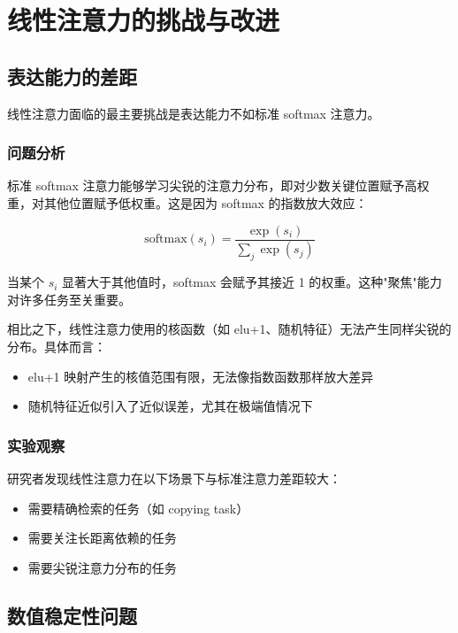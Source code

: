 \chapter{线性注意力的挑战与改进}

\section{表达能力的差距}

线性注意力面临的最主要挑战是表达能力不如标准 softmax 注意力。

\subsection{问题分析}

标准 softmax 注意力能够学习尖锐的注意力分布，即对少数关键位置赋予高权重，对其他位置赋予低权重。这是因为 softmax 的指数放大效应：

\begin{equation}
    \text{softmax}(s_i) = \frac{\exp(s_i)}{\sum_j \exp(s_j)}
\end{equation}

当某个 $s_i$ 显著大于其他值时，softmax 会赋予其接近 1 的权重。这种"聚焦"能力对许多任务至关重要。

相比之下，线性注意力使用的核函数（如 elu+1、随机特征）无法产生同样尖锐的分布。具体而言：

\begin{itemize}
    \item elu+1 映射产生的核值范围有限，无法像指数函数那样放大差异
    \item 随机特征近似引入了近似误差，尤其在极端值情况下
\end{itemize}

\subsection{实验观察}

研究者发现线性注意力在以下场景下与标准注意力差距较大：

\begin{itemize}
    \item 需要精确检索的任务（如 copying task）
    \item 需要关注长距离依赖的任务
    \item 需要尖锐注意力分布的任务
\end{itemize}

\section{数值稳定性问题}

